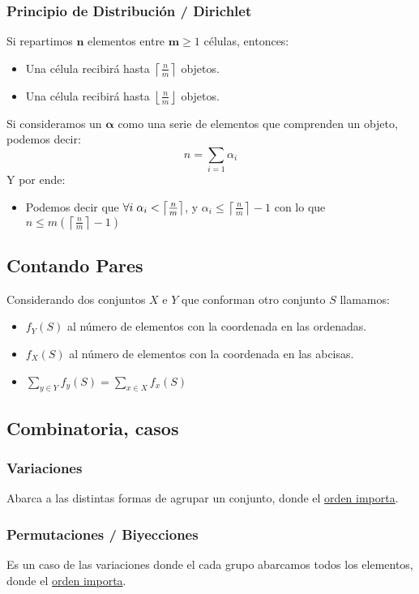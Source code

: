 \subsubsection{Principio de Distribución / Dirichlet}
 Si repartimos \(\mathbf{n}\) elementos entre \(\mathbf{m}\geq 1\) células, entonces:
\begin{itemize}
        \item Una célula recibirá hasta \(\left \lceil \frac{n}{m} \right \rceil\) objetos.
        \item Una célula recibirá hasta \(\left \lfloor \frac{n}{m} \right \rfloor\) objetos.
\end{itemize}
 Si consideramos un \(\mathbf{\alpha}\) como una serie de elementos que comprenden un objeto, podemos decir:
\[
        n = \sum_{i=1}\alpha_{i}
\]
 Y por ende:
\begin{itemize}
        \item Podemos decir que \(\forall i\hspace{1mm}\alpha_i < \left \lceil \frac{n}{m} \right \rceil\), y \(\alpha_i \leq \left \lceil \frac{n}{m} \right \rceil -1\) con lo que \(n \leq m \left ( \left \lceil \frac{n}{m}\right \rceil -1\right )\)
\end{itemize}
\subsection{Contando Pares}
 Considerando dos conjuntos \(X\) e \(Y\) que conforman otro conjunto \(S\) llamamos:
\begin{itemize}
        \item \(f_Y(S)\) al número de elementos con la coordenada en las ordenadas.
        \item \(f_X(S)\) al número de elementos con la coordenada en las abcisas.
        \item \(\sum_{y \in Y} f_y(S) =  \sum_{x \in X} f_x(S)\)
\end{itemize}
\subsection{Combinatoria, casos}
\subsubsection{Variaciones}
 Abarca a las distintas formas de agrupar un conjunto, donde el \underline{orden importa}.
\subsubsection{Permutaciones / Biyecciones}
 Es un caso de las variaciones donde el cada grupo abarcamos todos los elementos, donde el \underline{orden importa}.
